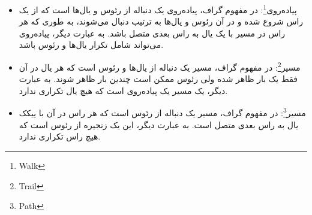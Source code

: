 \documentclass[a4paper,10pt]{article}
\begin{document}
\begin{itemize}
        \item پیاده‌روی\footnote{\hspace{2pt}Walk}: در مفهوم گراف، پیاده‌روی یک دنباله از رئوس و یال‌ها است که از یک راس شروع شده و در آن رئوس و یال‌ها به ترتیب دنبال می‌شوند، به طوری که هر راس در مسیر با یک یال به راس بعدی متصل باشد. به عبارت دیگر، پیاده‌روی می‌تواند شامل تکرار یال‌ها و رئوس باشد.
        
        \item مسیر\footnote{\hspace{2pt}Trail}: در مفهوم گراف، مسیر یک دنباله از یال‌ها و رئوس است که هر یال در آن فقط یک بار ظاهر شده ولی رئوس ممکن است چندین بار ظاهر شوند. به عبارت دیگر، یک مسیر یک پیاده‌روی است که هیچ یال تکراری ندارد.

        \item مسیر\footnote{\hspace{2pt}Path}: در مفهوم گراف، مسیر یک دنباله از رئوس است که هر راس در آن با ییکک یال به راس بعدی متصل است. به عبارت دیگر، این یک زنجیره از رئوس است که هیچ راس تکراری ندارد.

    \end{itemize}
\end{document}
